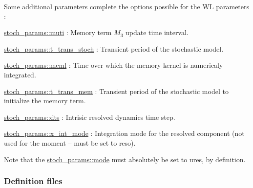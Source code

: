 Some additional parameters complete the options possible for the WL parameters \+:
\begin{DoxyItemize}
\item \hyperlink{namespacestoch__params_a6cfc7910476036f19018641599841686}{stoch\+\_\+params\+::muti} \+: Memory term $M_3$ update time interval.
\item \hyperlink{namespacestoch__params_a11aa6b888c2b4005aca690fb78e2c785}{stoch\+\_\+params\+::t\+\_\+trans\+\_\+stoch} \+: Transient period of the stochastic model.
\item \hyperlink{namespacestoch__params_a6de8fcb6d516d431ddc0285e0c296eb7}{stoch\+\_\+params\+::meml} \+: Time over which the memory kernel is numericaly integrated.
\item \hyperlink{namespacestoch__params_aad7f7a2481dfb730a051ae2e0de9494c}{stoch\+\_\+params\+::t\+\_\+trans\+\_\+mem} \+: Transient period of the stochastic model to initialize the memory term.
\item \hyperlink{namespacestoch__params_a760f666f9c629b98214821c8186f6ffc}{stoch\+\_\+params\+::dts} \+: Intrisic resolved dynamics time step.
\item \hyperlink{namespacestoch__params_ac3dca68023a442b69df79caaaea78894}{stoch\+\_\+params\+::x\+\_\+int\+\_\+mode} \+: Integration mode for the resolved component (not used for the moment -- must be set to \textquotesingle{}reso\textquotesingle{}).
\end{DoxyItemize}

Note that the \hyperlink{namespacestoch__params_a2c3f6439fd2d66413d065b533f2a6263}{stoch\+\_\+params\+::mode} must absolutely be set to \textquotesingle{}ures\textquotesingle{}, by definition.

\subsubsection*{Definition files}

